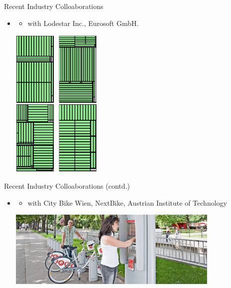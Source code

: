 \documentclass[aspectratio=1610]{beamer}
\begin{document}
\begin{frame}{Recent Industry Colloaborations}
\begin{itemize}
\itemsep3.5ex
	\item {}
	\begin{itemize}
	\item with Lodestar Inc., Eurosoft GmbH.
	\end{itemize} 

	\bigskip
	\includegraphics[width=0.34\textwidth, angle=90]{graphics/cutting_example.png}
\end{itemize}  
\end{frame}


\begin{frame}{Recent Industry Colloaborations (contd.)}
	\begin{itemize}
	\itemsep3.5ex
		\item {}
		\begin{itemize}
		\item with City Bike Wien, NextBike, Austrian Institute of Technology
		\end{itemize} 
	
		\bigskip
		\includegraphics[width=0.8\textwidth]{graphics/BBSS.jpg}
	\end{itemize}  
	\end{frame}
	
\end{document}
